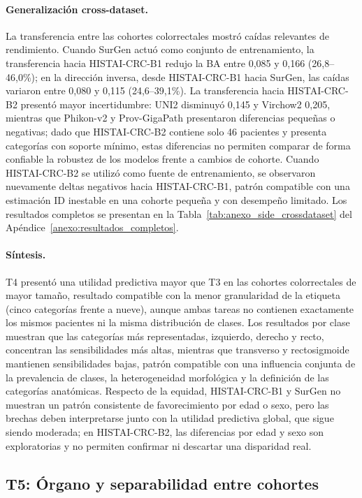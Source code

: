 \paragraph{Generalización cross-dataset.} La transferencia entre las cohortes colorrectales mostró caídas relevantes de rendimiento. Cuando SurGen actuó como conjunto de entrenamiento, la transferencia hacia HISTAI-CRC-B1 redujo la BA entre 0,085 y 0,166 (26,8--46,0\%); en la dirección inversa, desde HISTAI-CRC-B1 hacia SurGen, las caídas variaron entre 0,080 y 0,115 (24,6--39,1\%). La transferencia hacia HISTAI-CRC-B2 presentó mayor incertidumbre: UNI2 disminuyó 0,145 y Virchow2 0,205, mientras que Phikon-v2 y Prov-GigaPath presentaron diferencias pequeñas o negativas; dado que HISTAI-CRC-B2 contiene solo 46 pacientes y presenta categorías con soporte mínimo, estas diferencias no permiten comparar de forma confiable la robustez de los modelos frente a cambios de cohorte. Cuando HISTAI-CRC-B2 se utilizó como fuente de entrenamiento, se observaron nuevamente deltas negativos hacia HISTAI-CRC-B1, patrón compatible con una estimación ID inestable en una cohorte pequeña y con desempeño limitado. Los resultados completos se presentan en la Tabla~\ref{tab:anexo_side_crossdataset} del Apéndice~\ref{anexo:resultados_completos}.

\paragraph{Síntesis.} T4 presentó una utilidad predictiva mayor que T3 en las cohortes colorrectales de mayor tamaño, resultado compatible con la menor granularidad de la etiqueta (cinco categorías frente a nueve), aunque ambas tareas no contienen exactamente los mismos pacientes ni la misma distribución de clases. Los resultados por clase muestran que las categorías más representadas, izquierdo, derecho y recto, concentran las sensibilidades más altas, mientras que transverso y rectosigmoide mantienen sensibilidades bajas, patrón compatible con una influencia conjunta de la prevalencia de clases, la heterogeneidad morfológica y la definición de las categorías anatómicas. Respecto de la equidad, HISTAI-CRC-B1 y SurGen no muestran un patrón consistente de favorecimiento por edad o sexo, pero las brechas deben interpretarse junto con la utilidad predictiva global, que sigue siendo moderada; en HISTAI-CRC-B2, las diferencias por edad y sexo son exploratorias y no permiten confirmar ni descartar una disparidad real.

\subsection{T5: Órgano y separabilidad entre cohortes}
\label{sec:resultado_organ}
\label{sec:verificacion_center_effect}

